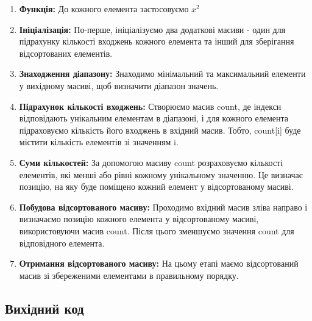 \documentclass[12pt]{extarticle}
\begin{document}
\begin{enumerate}

\item \textbf{Функція:} До кожного елемента застосовуємо $x^2$
\item \textbf{Ініціалізація:} По-перше, ініціалізуємо два додаткові масиви 
- один для підрахунку кількості входжень кожного елемента та інший для 
зберігання відсортованих елементів.
\item \textbf{Знаходження діапазону:} Знаходимо мінімальний та максимальний 
елементи у вихідному масиві, щоб визначити діапазон значень.
\item \textbf{Підрахунок кількості входжень:} Створюємо масив count, де індекси
 відповідають унікальним елементам в діапазоні, і для кожного 
 елемента підраховуємо кількість його входжень в вхідний масив.
  Тобто, count[i] буде містити кількість елементів зі значенням i.
\item \textbf{Суми кількостей:} За допомогою масиву count розраховуємо кількості елементів, які менші або рівні кожному унікальному значенню. Це визначає позицію, на яку буде поміщено кожний елемент у відсортованому масиві.
\item \textbf{Побудова відсортованого масиву:} Проходимо вхідний масив зліва направо і визначаємо позицію кожного елемента у відсортованому масиві, використовуючи масив count. Після цього зменшуємо значення count для відповідного елемента.
\item \textbf{Отримання відсортованого масиву:} На цьому етапі маємо відсортований масив зі збереженими елементами в правильному порядку.


\end{enumerate}

\subsection*{Вихідний код}
\end{document}
